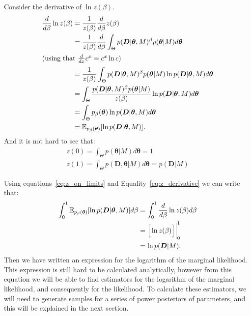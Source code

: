 Consider the derivative of $\ln z(\beta)$.
\begin{align}
    \frac{d}{d\beta} \ln z(\beta) &= \frac{1}{z(\beta)}  
        \frac{d}{d\beta} z(\beta) \notag\\
    &= 
    \frac{1}{z(\beta)} \frac{d}{d\beta} 
    \int_\Theta p ({\bm D} | {\bm \theta}, M)^\beta 
    p({\bm \theta} | M) d{\bm \theta} \notag\\
    \shortintertext{(using that $\frac{d}{dx} c^x = c^x \ln c$)}
    &= 
    \frac{1}{z(\beta)} \int_\Theta p ({\bm D} | {\bm \theta}, M)^\beta 
    p({\bm \theta} | M) \ln p({\bm D}|{\bm \theta}, M)
    d{\bm \theta} \notag\\
    &= 
    \int_\Theta \frac{p ({\bm D} | {\bm \theta}, M)^\beta 
        p({\bm \theta} | M)}
                     {z(\beta)}
    \ln p({\bm D}| {\bm \theta}, M)d{\bm \theta} \notag\\
    &=
    \int_\Theta p_\beta ({\bm \theta}) 
    \ln p ({\bm D} | {\bm \theta}, M)d{\bm \theta} \notag\\ 
    &=
    \mathbb{E}_{p_\beta ({\bm \theta})} 
    [\ln p({\bm D} | {\bm \theta}, M)]. \label{eq:z_derivative}
\end{align}
And it is not hard to see that:
\begin{equation}
\begin{gathered}
    z (0) = \int_\Theta p ({\bm \theta} | M)d{\bm \theta} = 1 \\
    z (1) = \int_\Theta p ({\bm D}, {\bm \theta} | M)d
        {\bm \theta} = p ({\bm D} | M)
    \label{eq:z_on_limits}
\end{gathered}
\end{equation}

Using equations~\ref{eq:z_on_limits} and Equality~\ref{eq:z_derivative}
we can write that:
\begin{align}
    \int_0^1 \mathbb{E}_{p_\beta ({\bm \theta})} 
        [\ln p({\bm D}|{\bm \theta}, M)]d\beta 
    &= \int_0^1 \frac{d}{d\beta} \ln z(\beta) d\beta \notag \\
    &= \Big[\ln z(\beta)\Big]\bigg\rvert^1_0 \notag \\
    &= \ln p ({\bm D} | M).
    \label{eq:thermodynamic_integral}
\end{align}
Then we have written an expression for the logarithm of the marginal
likelihood. This expression is still hard to be calculated analytically,
however from this equation we will be able to find estimators for
the logarithm of the marginal likelihood, and consequently for the
likelihood. To calculate these estimators, we will need to generate 
samples for a series of power posteriors of parameters, and this will
be explained in the next section.

